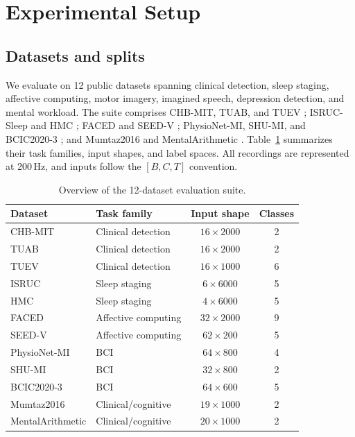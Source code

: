 \section{Experimental Setup}
\label{sec:experiments}

\subsection{Datasets and splits}

We evaluate on 12 public datasets spanning clinical detection, sleep staging,
affective computing, motor imagery, imagined speech, depression detection,
and mental workload. The suite comprises CHB-MIT, TUAB, and TUEV
\citep{shoeb2009application,obeid2016temple}; ISRUC-Sleep and HMC
\citep{khalighi2016isruc,alvarez2022hmc}; FACED and SEED-V
\citep{chen2023large,liu2022comparing}; PhysioNet-MI, SHU-MI, and
BCIC2020-3 \citep{schalk2004bci2000,ma2022large,jeong20222020}; and
Mumtaz2016 and MentalArithmetic \citep{mumtaz2016mdd,zyma2019mental}.
Table~\ref{tab:datasets} summarizes their task families, input shapes, and
label spaces. All recordings are represented at 200\,Hz, and inputs follow the
$[B,C,T]$ convention.

\begin{table}[t]
\centering
\caption{Overview of the 12-dataset evaluation suite.}
\label{tab:datasets}
\small
\setlength{\tabcolsep}{3pt}
\renewcommand{\arraystretch}{0.96}
\begin{tabular*}{\textwidth}{@{\extracolsep{\fill}}llcc@{}}
\toprule
Dataset & Task family & Input shape & Classes \\
\midrule
CHB-MIT & Clinical detection & $16\times2000$ & 2 \\
TUAB & Clinical detection & $16\times2000$ & 2 \\
TUEV & Clinical detection & $16\times1000$ & 6 \\
ISRUC & Sleep staging & $6\times6000$ & 5 \\
HMC & Sleep staging & $4\times6000$ & 5 \\
FACED & Affective computing & $32\times2000$ & 9 \\
SEED-V & Affective computing & $62\times200$ & 5 \\
PhysioNet-MI & BCI & $64\times800$ & 4 \\
SHU-MI & BCI & $32\times800$ & 2 \\
BCIC2020-3 & BCI & $64\times600$ & 5 \\
Mumtaz2016 & Clinical/cognitive & $19\times1000$ & 2 \\
MentalArithmetic & Clinical/cognitive & $20\times1000$ & 2 \\
\bottomrule
\end{tabular*}
\end{table}

